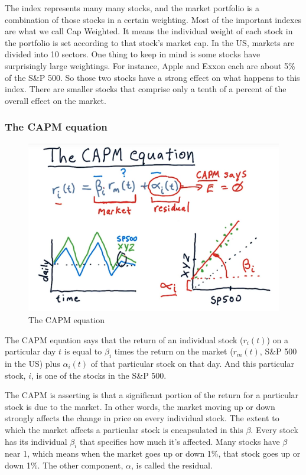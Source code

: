 \documentclass[12pt]{article}
\begin{document}
The index represents many many stocks, and the market portfolio is a combination of those stocks in a certain weighting. Most of the important indexes are what we call Cap Weighted. It means the individual weight of each stock in the portfolio is set according to that stock's market cap. In the US, markets are divided into 10 sectors. One thing to keep in mind is some stocks have surprisingly large weightings. For instance, Apple and Exxon each are about 5\% of the S\&P 500. So those two stocks have a strong effect on what happens to this index. There are smaller stocks that comprise only a tenth of a percent of the overall effect on the market. 

\subsubsection{The CAPM equation}

\begin{figure}[!ht]
\centering
\includegraphics[scale=0.4]{fig/fig38}
\caption{The CAPM equation}
\end{figure}

\noindent
The CAPM equation says that the return of an individual stock ($r_i(t)$) on a particular day $t$ is equal to $\beta_i$ times the return on the market ($r_m(t)$, S\&P 500 in the US) plus $\alpha_i(t)$ of that particular stock on that day. And this particular stock, $i$, is one of the stocks in the S\&P 500.

The CAPM is asserting is that a significant portion of the return for a particular stock is due to the market. In other words, the market moving up or down strongly affects the change in price on every individual stock. The extent to which the market affects a particular stock is encapsulated in this $\beta$. Every stock has its individual $\beta_i$ that specifies how much it's affected. Many stocks have $\beta$ near 1, which means when the market goes up or down 1\%, that stock goes up or down 1\%. The other component, $\alpha$, is called the residual. 
\end{document}
